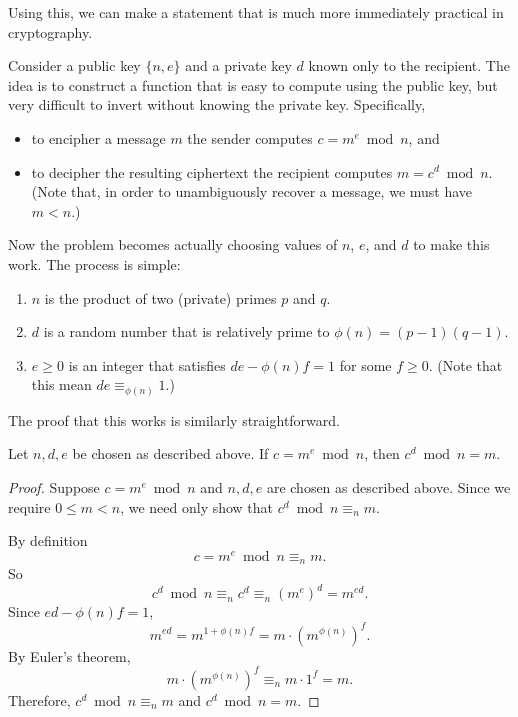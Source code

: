 \documentclass[../m55main.tex]{subfiles}
\begin{document}
Using this, we can make a statement that is much more immediately practical in cryptography.

Consider a public key $\{ n, e \}$ and a private key $d$ known only to the recipient.
The idea is to construct a function that is easy to compute using the public key, but very difficult to invert without knowing the private key.
Specifically,
\begin{itemize}
    \item to encipher a message $m$ the sender computes $c = m^e \bmod n$, and
    \item to decipher the resulting ciphertext the recipient computes $m = c^d \bmod n$.
    (Note that, in order to unambiguously recover a message, we must have $m < n$.)
\end{itemize}
Now the problem becomes actually choosing values of $n$, $e$, and $d$ to make this work.
The process is simple:
\begin{enumerate}
    \item $n$ is the product of two (private) primes $p$ and $q$.
    \item $d$ is a random number that is relatively prime to $\phi (n) = (p-1)(q-1)$.
    \item $e \geq 0$ is an integer that satisfies $de - \phi (n) f = 1$ for some $f \geq 0$.
    (Note that this mean $de \equiv_{\phi (n)} 1$.)
\end{enumerate}
The proof that this works is similarly straightforward.

\begin{theorem}
    Let $n,d,e$ be chosen as described above.
    If $c = m^e \bmod n$, then $c^d \bmod n = m$.
\end{theorem}

\begin{proof}
    Suppose $c = m^e \bmod n$ and $n,d,e$ are chosen as described above.
    Since we require $0 \leq m < n$, we need only show that $c^d \bmod n \equiv_n m$.

    By definition
    \[ c = m^e \bmod n \equiv_n m. \]
    So
    \[ c^d \bmod n \equiv_n c^d \equiv_n \left( m^e \right)^d = m^{ed}. \]
    Since $ed - \phi (n) f = 1$,
    \[ m^{ed} = m^{1 + \phi(n) f} = m \cdot \left( m^{\phi (n)} \right)^f. \]
    By Euler's theorem,
    \[ m \cdot \left( m^{\phi (n)} \right)^f \equiv_n m \cdot 1^f = m. \]
    Therefore, $c^d \bmod n \equiv_n m$ and $c^d \bmod n = m$.
\end{proof}
\end{document}
